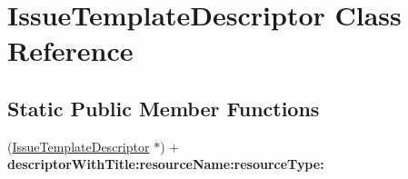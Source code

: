 \hypertarget{interface_issue_template_descriptor}{
\section{IssueTemplateDescriptor Class Reference}
\label{interface_issue_template_descriptor}
}
\subsection*{Static Public Member Functions}
\begin{DoxyCompactItemize}
\item 
\hypertarget{interface_issue_template_descriptor_a35bc5ddb59fc912b7f0d595e79b37d4f}{
(\hyperlink{interface_issue_template_descriptor}{IssueTemplateDescriptor} $\ast$) + {\bfseries descriptorWithTitle:resourceName:resourceType:}}
\label{interface_issue_template_descriptor_a35bc5ddb59fc912b7f0d595e79b37d4f}

\end{DoxyCompactItemize}
